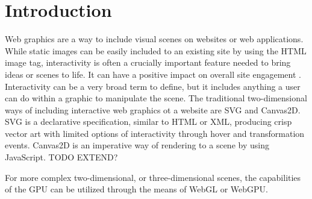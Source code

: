 %
%
% 
% 


\chapter{Introduction}

\label{chap:Intro}
Web graphics are a way to include visual scenes on websites or web applications.
While static images can be easily included to an existing site by using the HTML image tag,
interactivity is often a crucially important feature needed to bring ideas or scenes to life.
It can have a positive impact on overall site engagement \parencite{web-engagement-literature}.
Interactivity can be a very broad term to define, but it includes anything a user can do within
a graphic to manipulate the scene. The traditional two-dimensional ways of including interactive
web graphics ot a website are SVG and Canvas2D.
SVG is a declarative specification, similar to HTML or XML, producing crisp vector art with
limited options of interactivity through hover and transformation events.
Canvas2D is an imperative way of rendering to a scene by using JavaScript. TODO EXTEND?

For more complex two-dimensional, or three-dimensional scenes, the capabilities of the GPU can be utilized
through the means of WebGL or WebGPU.

